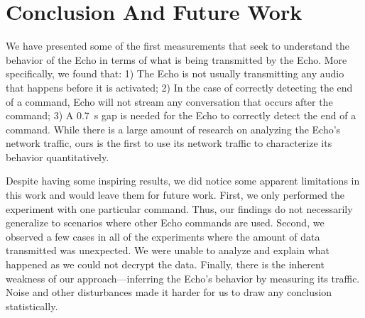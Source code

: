 \section{Conclusion And Future Work}
We have presented some of the first measurements that seek to understand the behavior of the Echo in terms of what is being transmitted by the Echo. More specifically, we found that: 1) The Echo is not usually transmitting any audio that happens before it is activated; 2) In the case of correctly detecting the end of a command, Echo will not stream any conversation that occurs after the command; 3) A 0.7~s gap is needed for the Echo to correctly detect the end of a command. While there is a large amount of research on analyzing the Echo’s network traffic, ours is the first to use its network traffic to characterize its behavior quantitatively.

Despite having some inspiring results, we did notice some apparent limitations in this work and would leave them for future work. First, we only performed the experiment with one particular command. Thus, our findings do not necessarily generalize to scenarios where other Echo commands are used. Second, we observed a few cases in all of the experiments where the amount of data transmitted was unexpected. We were unable to analyze and explain what happened as we could not decrypt the data. Finally, there is the inherent weakness of our approach---inferring the Echo's behavior by measuring its traffic. Noise and other disturbances made it harder for us to draw any conclusion statistically.